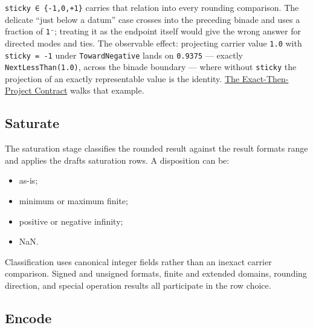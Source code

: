 \texttt{sticky ∈ \{-1,0,+1\}} carries that relation into every rounding comparison. The delicate “just below a datum” case crosses into the preceding binade and uses a fraction of \texttt{1⁻}; treating it as the endpoint itself would give the wrong answer for directed modes and ties. The observable effect: projecting carrier value \texttt{1.0} with \texttt{sticky = -1} under \texttt{TowardNegative} lands on \texttt{0.9375} — exactly \texttt{NextLessThan(1.0)}, across the binade boundary — where without \texttt{sticky} the projection of an exactly representable value is the identity. \href{concept\_\allowbreak{}exact\_\allowbreak{}then\_\allowbreak{}project.md}{The Exact-Then-Project Contract} walks that example.



\subsection{Saturate}



\label{13912098488727515218}{}


The saturation stage classifies the rounded result against the result format{\textquotesingle}s range and applies the draft{\textquotesingle}s saturation rows. A disposition can be:



\begin{itemize}
\item as-is;


\item minimum or maximum finite;


\item positive or negative infinity;


\item NaN.

\end{itemize}


Classification uses canonical integer fields rather than an inexact carrier comparison. Signed and unsigned formats, finite and extended domains, rounding direction, and special operation results all participate in the row choice.



\subsection{Encode}



\label{14695285579403998501}{}


